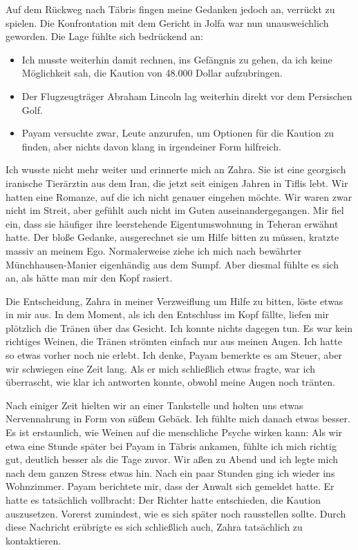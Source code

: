 Auf dem Rückweg nach Täbris fingen meine Gedanken jedoch an, verrückt zu spielen. Die Konfrontation mit dem Gericht in Jolfa war nun unausweichlich geworden. Die Lage fühlte sich bedrückend an:

\begin{itemize}
  \item Ich musste weiterhin damit rechnen, ins Gefängnis zu gehen, da ich keine Möglichkeit sah, die Kaution von 48.000 Dollar aufzubringen.
\end{itemize}

\begin{itemize}
  \item Der Flugzeugträger Abraham Lincoln lag weiterhin direkt vor dem Persischen Golf.
\end{itemize}

\begin{itemize}
  \item Payam versuchte zwar, Leute anzurufen, um Optionen für die Kaution zu finden, aber nichts davon klang in irgendeiner Form hilfreich.
\end{itemize}

Ich wusste nicht mehr weiter und erinnerte mich an Zahra. Sie ist eine georgisch iranische Tierärztin aus dem Iran, die jetzt seit einigen Jahren in Tiflis lebt. Wir hatten eine Romanze, auf die ich nicht genauer eingehen möchte. Wir waren zwar nicht im Streit, aber gefühlt auch nicht im Guten auseinandergegangen. Mir fiel ein, dass sie häufiger ihre leerstehende Eigentumswohnung in Teheran erwähnt hatte. Der bloße Gedanke, ausgerechnet sie um Hilfe bitten zu müssen, kratzte massiv an meinem Ego. Normalerweise ziehe ich mich nach bewährter Münchhausen-Manier eigenhändig aus dem Sumpf. Aber diesmal fühlte es sich an, als hätte man mir den Kopf rasiert.

Die Entscheidung, Zahra in meiner Verzweiflung um Hilfe zu bitten, löste etwas in mir aus. In dem Moment, als ich den Entschluss im Kopf fällte, liefen mir plötzlich die Tränen über das Gesicht. Ich konnte nichts dagegen tun. Es war kein richtiges Weinen, die Tränen strömten einfach nur aus meinen Augen. Ich hatte so etwas vorher noch nie erlebt. Ich denke, Payam bemerkte es am Steuer, aber wir schwiegen eine Zeit lang. Als er mich schließlich etwas fragte, war ich überrascht, wie klar ich antworten konnte, obwohl meine Augen noch tränten.

Nach einiger Zeit hielten wir an einer Tankstelle und holten uns etwas Nervennahrung in Form von süßem Gebäck. Ich fühlte mich danach etwas besser. Es ist erstaunlich, wie Weinen auf die menschliche Psyche wirken kann: Als wir etwa eine Stunde später bei Payam in Täbris ankamen, fühlte ich mich richtig gut, deutlich besser als die Tage zuvor. Wir aßen zu Abend und ich legte mich nach dem ganzen Stress etwas hin. Nach ein paar Stunden ging ich wieder ins Wohnzimmer. Payam berichtete mir, dass der Anwalt sich gemeldet hatte. Er hatte es tatsächlich vollbracht: Der Richter hatte entschieden, die Kaution auszusetzen. Vorerst zumindest, wie es sich später noch rausstellen sollte. Durch diese Nachricht erübrigte es sich schließlich auch, Zahra tatsächlich zu kontaktieren.

